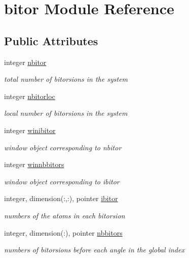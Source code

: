 \hypertarget{classbitor}{\section{bitor Module Reference}
\label{classbitor}
}
\subsection*{Public Attributes}
\begin{DoxyCompactItemize}
\item 
integer \hyperlink{classbitor_af623cebc20e2041963d4656c8f08d008}{nbitor}
\begin{DoxyCompactList}\small\item\em total number of bitorsions in the system \end{DoxyCompactList}\item 
integer \hyperlink{classbitor_aa3ca03217a11110d43f742bc392e13cc}{nbitorloc}
\begin{DoxyCompactList}\small\item\em local number of bitorsions in the system \end{DoxyCompactList}\item 
integer \hyperlink{classbitor_a2f70e673c8c6ef2e72dd74407de89533}{winibitor}
\begin{DoxyCompactList}\small\item\em window object corresponding to nbitor \end{DoxyCompactList}\item 
integer \hyperlink{classbitor_a76befb63ae9b30cc6cd457d599f798c0}{winnbbitors}
\begin{DoxyCompactList}\small\item\em window object corresponding to ibitor \end{DoxyCompactList}\item 
integer, dimension(\-:,\-:), pointer \hyperlink{classbitor_a913b230eb13fc4829d92479745b98a2a}{ibitor}
\begin{DoxyCompactList}\small\item\em numbers of the atoms in each bitorsion \end{DoxyCompactList}\item 
integer, dimension(\-:), pointer \hyperlink{classbitor_aa20a049145348af5fbb86813dfdf9c6b}{nbbitors}
\begin{DoxyCompactList}\small\item\em numbers of bitorsions before each angle in the global index \end{DoxyCompactList}\end{DoxyCompactItemize}


